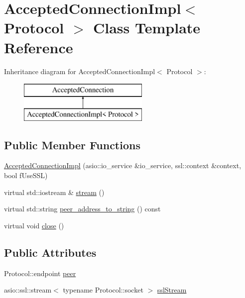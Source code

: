 \hypertarget{class_accepted_connection_impl}{}\section{Accepted\+Connection\+Impl$<$ Protocol $>$ Class Template Reference}
\label{class_accepted_connection_impl}
Inheritance diagram for Accepted\+Connection\+Impl$<$ Protocol $>$\+:\begin{figure}[H]
\begin{center}
\leavevmode
\includegraphics[height=2.000000cm]{class_accepted_connection_impl}
\end{center}
\end{figure}
\subsection*{Public Member Functions}
\begin{DoxyCompactItemize}
\item 
\hyperlink{class_accepted_connection_impl_adaf674801c89a76de0bbb4154f2cf3b8}{Accepted\+Connection\+Impl} (asio\+::io\+\_\+service \&io\+\_\+service, ssl\+::context \&context, bool f\+Use\+S\+S\+L)
\item 
virtual std\+::iostream \& \hyperlink{class_accepted_connection_impl_ab15396a413e40f947b7d527a2afe37fa}{stream} ()
\item 
virtual std\+::string \hyperlink{class_accepted_connection_impl_a5fe6c34eeec9f5c829629ae3e0539a11}{peer\+\_\+address\+\_\+to\+\_\+string} () const 
\item 
virtual void \hyperlink{class_accepted_connection_impl_a1b114863c047cae57ce42564f9a29be1}{close} ()
\end{DoxyCompactItemize}
\subsection*{Public Attributes}
\begin{DoxyCompactItemize}
\item 
Protocol\+::endpoint \hyperlink{class_accepted_connection_impl_ade939b7d2778690cf78a9f6719f47c76}{peer}
\item 
asio\+::ssl\+::stream$<$ typename Protocol\+::socket $>$ \hyperlink{class_accepted_connection_impl_afcfc99c020d301985bc19b4075fc7e78}{ssl\+Stream}
\end{DoxyCompactItemize}


